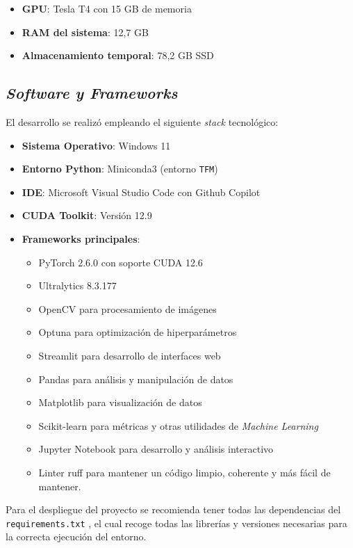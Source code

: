 \documentclass[12pt,a4paper,onecolumn,oneside]{report}
\begin{document}
\begin{itemize}
    \item \textbf{GPU}: Tesla T4 con 15 GB de memoria
    \item \textbf{RAM del sistema}: 12,7 GB
    \item \textbf{Almacenamiento temporal}: 78,2 GB SSD
\end{itemize}

\subsection{\textit{Software y Frameworks}}

El desarrollo se realizó empleando el siguiente \textit{stack} tecnológico:

\begin{itemize}
    \item \textbf{Sistema Operativo}: Windows 11
    \item \textbf{Entorno Python}: Miniconda3 (entorno \texttt{TFM})
    \item \textbf{IDE}: Microsoft Visual Studio Code con Github Copilot
    \item \textbf{CUDA Toolkit}: Versión 12.9
    \item \textbf{Frameworks principales}:
    \begin{itemize}
        \item PyTorch 2.6.0 con soporte CUDA 12.6
        \item Ultralytics 8.3.177
        \item OpenCV para procesamiento de imágenes
        \item Optuna para optimización de hiperparámetros 
        \item Streamlit para desarrollo de interfaces web
        \item Pandas para análisis y manipulación de datos
        \item Matplotlib para visualización de datos 
        \item Scikit-learn para métricas y otras utilidades de \textit{Machine Learning}
        \item Jupyter Notebook para desarrollo y análisis interactivo
        \item Linter ruff para mantener un código limpio, coherente y más fácil de mantener.
    \end{itemize}
\end{itemize}

Para el despliegue del proyecto se recomienda tener todas las dependencias del \texttt{requirements.txt} \cite{repoTFM}, el cual 
recoge todas las librerías y versiones necesarias para la correcta ejecución del entorno.
\end{document}
